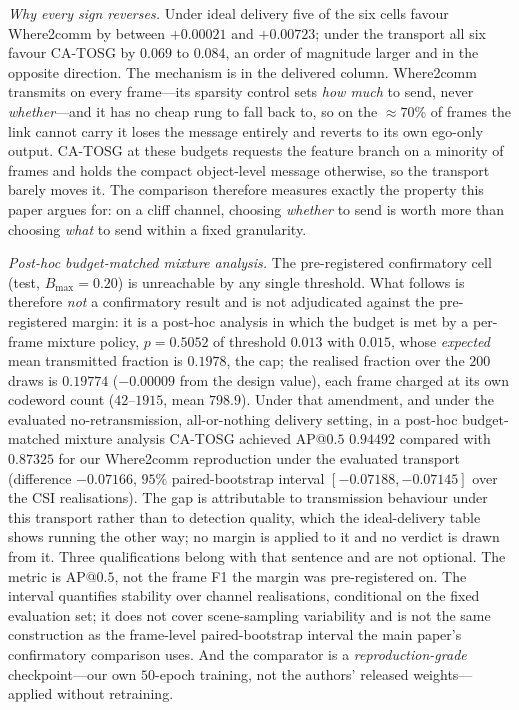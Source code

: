 \documentclass[journal]{IEEEtran}
\newcommand{\method}{CA-TOSG}
\begin{document}
\emph{Why every sign reverses.} Under ideal delivery five of the six cells favour Where2comm by
between $+0.00021$ and $+0.00723$; under the transport all six favour \method{} by $0.069$ to
$0.084$, an order of magnitude larger and in the opposite direction. The mechanism is in the
delivered column. Where2comm transmits on every frame---its sparsity control sets \emph{how much} to
send, never \emph{whether}---and it has no cheap rung to fall back to, so on the ${\approx}70\%$ of
frames the link cannot carry it loses the message entirely and reverts to its own ego-only output.
\method{} at these budgets requests the feature branch on a minority of frames and holds the compact
object-level message otherwise, so the transport barely moves it. The comparison therefore measures
exactly the property this paper argues for: on a cliff channel, choosing \emph{whether} to send is
worth more than choosing \emph{what} to send within a fixed granularity.

\emph{Post-hoc budget-matched mixture analysis.} The pre-registered confirmatory cell (test,
$B_{\max}=0.20$) is unreachable by any single threshold. What follows is therefore \emph{not} a
confirmatory result and is not adjudicated against the pre-registered margin: it is a post-hoc
analysis in which the budget is met by a per-frame mixture policy, $p=0.5052$ of threshold $0.013$ with $0.015$, whose
\emph{expected} mean transmitted fraction is $0.1978$, the cap; the realised fraction over the $200$
draws is $0.19774$ ($-0.00009$ from the design value), each frame charged at its own codeword count
($42$--$1915$, mean $798.9$). Under that amendment, and under the evaluated no-retransmission, all-or-nothing delivery
setting, in a post-hoc budget-matched mixture analysis \method{} achieved AP@$0.5$
$0.94492$ compared with $0.87325$ for our Where2comm reproduction under the evaluated transport
(difference $-0.07166$, $95\%$ paired-bootstrap interval $[-0.07188,-0.07145]$ over the CSI
realisations). The gap is attributable to transmission behaviour under this transport rather
than to detection quality, which the ideal-delivery table shows running the other way; no margin is
applied to it and no verdict is drawn from it. Three qualifications belong with that sentence and are not optional.
The metric is AP@$0.5$, not the frame F1 the margin was pre-registered on. The interval quantifies
stability over channel realisations, conditional on the fixed evaluation set; it does not cover
scene-sampling variability and is not the same construction as the frame-level
paired-bootstrap interval the main paper's confirmatory comparison uses. And the comparator is a \emph{reproduction-grade}
checkpoint---our own $50$-epoch training, not the authors' released weights---applied without
retraining.
\end{document}
